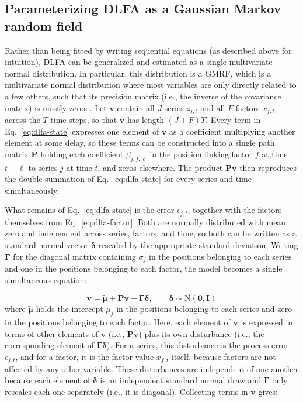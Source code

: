\documentclass[12pt]{article}
\begin{document}
\subsection{Parameterizing DLFA as a Gaussian Markov random field}

Rather than being fitted by writing sequential equations (as described
above for intuition), DLFA can be generalized and estimated as a single
multivariate normal distribution. In particular, this distribution is a GMRF, which is a multivariate normal
distribution where most variables are only directly related to a few
others, such that its precision matrix (i.e., the inverse of the
covariance matrix) is mostly zeros \citep{rue_gaussian_2005}. Let $\mathbf{v}$ contain all $J$
series $z_{j,t}$ and all $F$ factors $x_{f,t}$ across the $T$
time-steps, so that $\mathbf{v}$ has length $(J+F)T$. Every term in
Eq.~\ref{eq:dlfa-state} expresses one element of $\mathbf{v}$ as a
coefficient multiplying another element at some delay, so these terms
can be constructed into a single path matrix $\mathbf{P}$ holding each
coefficient $\beta_{j,f,\ell}$ in the position linking factor $f$ at
time $t-\ell$ to series $j$ at time $t$, and zeros elsewhere. The
product $\mathbf{P}\mathbf{v}$ then reproduces the double summation of
Eq.~\ref{eq:dlfa-state} for every series and time simultaneously.

What remains of Eq.~\ref{eq:dlfa-state} is the error $\epsilon_{j,t}$,
together with the factors themselves from Eq.~\ref{eq:dlfa-factor}. Both
are normally distributed with mean zero and independent across series,
factors, and time, so both can be written as a standard normal vector
$\boldsymbol\delta$ rescaled by the appropriate standard deviation.
Writing $\boldsymbol\Gamma$ for the diagonal matrix containing
$\sigma_j$ in the positions belonging to each series and one in the
positions belonging to each factor, the model becomes a single
simultaneous equation:

\begin{equation}
  \mathbf{v} = \tilde{\boldsymbol\mu} + \mathbf{P}\mathbf{v} +
  \boldsymbol\Gamma \boldsymbol\delta, \qquad
  \boldsymbol\delta \sim \mathrm{N}\!\left(\mathbf{0}, \mathbf{I}\right)
  \label{eq:gmrf-sem}
\end{equation}
where $\tilde{\boldsymbol\mu}$ holds the intercept $\mu_j$ in the
positions belonging to each series and zero in the positions belonging
to each factor. Here, each element of $\mathbf{v}$ is expressed in terms
of other elements of $\mathbf{v}$ (i.e., $\mathbf{P}\mathbf{v}$) plus
its own disturbance (i.e., the corresponding element of
$\boldsymbol\Gamma\boldsymbol\delta$). For a series, this disturbance
is the process error $\epsilon_{j,t}$, and for a factor, it is the
factor value $x_{f,t}$ itself, because factors are not affected by any
other variable. These disturbances are independent of one another
because each element of $\boldsymbol\delta$ is an independent standard
normal draw and $\boldsymbol\Gamma$ only rescales each one separately
(i.e., it is diagonal). Collecting terms in $\mathbf{v}$ gives:
\end{document}
